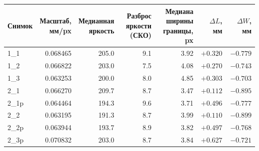 \begin{tabular}{@{}lrrrrrr@{}}
\toprule
Снимок & \shortstack{Масштаб,\\мм/px} & \shortstack{Медианная\\яркость} &
\shortstack{Разброс яркости\\(СКО)} &
\shortstack{Медиана ширины\\границы, px} & $\Delta L$, мм & $\Delta W$, мм \\
\midrule
1\_1 & \num{0.068465} & \num{205.0} & \num{9.1} & \num{3.92} & $+\num{0.320}$ & $-\num{0.779}$ \\
1\_2 & \num{0.066822} & \num{203.0} & \num{7.5} & \num{4.08} & $+\num{0.270}$ & $-\num{0.743}$ \\
1\_3 & \num{0.063253} & \num{200.0} & \num{8.0} & \num{4.85} & $+\num{0.303}$ & $-\num{0.703}$ \\
2\_1 & \num{0.066270} & \num{209.7} & \num{8.7} & \num{3.47} & $+\num{0.112}$ & $-\num{0.895}$ \\
2\_1p & \num{0.064464} & \num{194.3} & \num{9.6} & \num{3.71} & $+\num{0.496}$ & $-\num{0.777}$ \\
2\_2 & \num{0.063195} & \num{191.3} & \num{8.7} & \num{3.99} & $+\num{0.110}$ & $-\num{0.899}$ \\
2\_2p & \num{0.063944} & \num{193.7} & \num{8.9} & \num{3.82} & $+\num{0.497}$ & $-\num{0.768}$ \\
2\_3p & \num{0.070832} & \num{203.0} & \num{8.7} & \num{3.84} & $+\num{0.627}$ & $-\num{0.721}$ \\
\bottomrule
\end{tabular}
